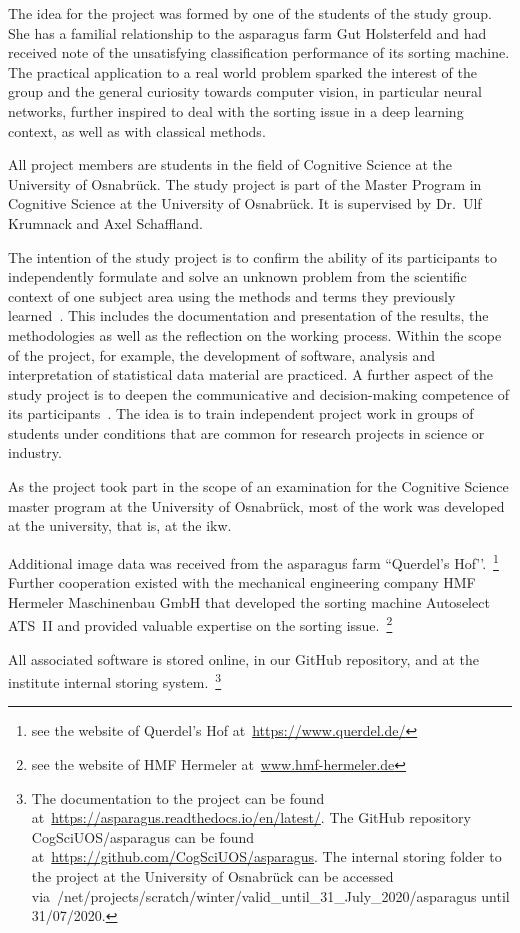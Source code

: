 The idea for the project was formed by one of the students of the study group. She has a familial relationship to the asparagus farm Gut Holsterfeld and had received note of the unsatisfying classification performance of its sorting machine. The practical application to a real world problem sparked the interest of the group and the general curiosity towards computer vision, in particular neural networks, further inspired to deal with the sorting issue in a deep learning context, as well as with classical methods.

All project members are students in the field of Cognitive Science at the University of Osnabr{\"u}ck. The study project is part of the Master Program in Cognitive Science at the University of Osnabr{\"u}ck. It is supervised by Dr.\ Ulf Krumnack and Axel Schaffland.

The intention of the study project is to confirm the ability of its participants to independently formulate and solve an unknown problem from the scientific context of one subject area using the methods and terms they previously learned~\citep{moduledescription,studyregulations}. This includes the documentation and presentation of the results, the methodologies as well as the reflection on the working process. Within the scope of the project, for example, the development of software, analysis and interpretation of statistical data material are practiced. A further aspect of the study project is to deepen the communicative and decision-making competence of its participants~\citep{moduledescription}. The idea is to train independent project work in groups of students under conditions that are common for research projects in science or industry.

As the project took part in the scope of an examination for the Cognitive Science master program at the University of Osnabr{\"u}ck, most of the work was developed at the university, that is, at the \acrfull{ikw}. 

Additional image data was received from the asparagus farm ``Querdel’s Hof’’.~\footnote{see the website of Querdel’s Hof at~\url{https://www.querdel.de/}} Further cooperation existed with the mechanical engineering company HMF Hermeler Maschinenbau GmbH that developed the sorting machine Autoselect ATS~II and provided valuable expertise on the sorting issue.~\footnote{see the website of HMF Hermeler at~\url{www.hmf-hermeler.de}}

All associated software is stored online, in our GitHub repository, and at the institute internal storing system.~\footnote{The documentation to the project can be found at~\url{https://asparagus.readthedocs.io/en/latest/}. The GitHub repository CogSciUOS/asparagus can be found at~\url{https://github.com/CogSciUOS/asparagus}. The internal storing folder to the project at the University of Osnabr{\"u}ck can be accessed via~/net/projects/scratch/winter/valid\_until\_31\_July\_2020/asparagus until 31/07/2020.}



